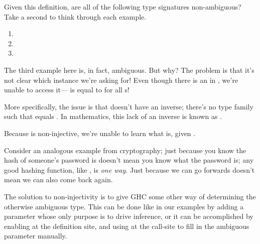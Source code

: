 \documentclass[book.tex]{subfiles}
\begin{document}

Given this definition, are all of the following type signatures non-ambiguous?
Take a second to think through each example.

\begin{enumerate}
  \item{}
  \item{}
  \item{}
\end{enumerate}

The third example here is, in fact, ambiguous. But why? The problem is that it's
not clear which  instance we're asking for! Even though there is an
 in , we're unable to access
it--- is equal to \ty{()} for all s!

More specifically, the issue is that  doesn't have an inverse;
there's no  type family such that  equals
. In mathematics, this lack of an inverse is known as
.

Because  is non-injective, we're unable to learn what  is,
given .

Consider an analogous example from cryptography; just because you know the hash
of someone's password is  doesn't mean you know what the
password is; any good hashing function, like , is \emph{one way}.
Just because we can go forwards doesn't mean we can also come back again.

The solution to non-injectivity is to give GHC some other way of determining the
otherwise ambiguous type. This can be done like in our examples by adding a
 parameter whose only purpose is to drive inference, or it can be
accomplished by enabling  at the definition site,
and using  at the call-site to fill in the ambiguous
parameter manually.
\end{document}

